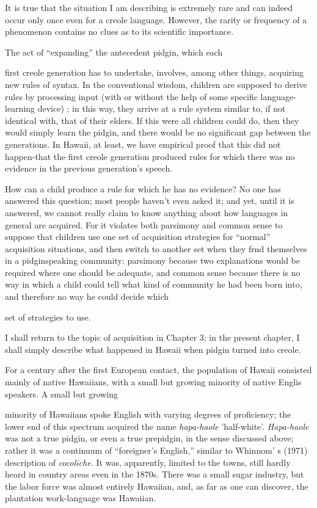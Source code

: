 It is true that the situation I am describing is extremely rare and can indeed occur only once even for a creole language. However, the rarity or frequency of a phenomenon contains no clues as to its scientific importance.

The act of ``expanding'' the antecedent pidgin, which each

first creole generation has to undertake, involves, among other things, acquiring new rules of syntax. In the conventional wisdom, children are supposed to derive rules by processing input (with or without the help of some specific language-learning device) ; in this way, they arrive at a rule system similar to, if not identical with, that of their elders. If this were all children could do, then they would simply learn the pidgin, and there would be no significant gap between the generations. In Hawaii, at least, we have empirical proof that this did not happen-that the first creole generation produced rules for which there was no evidence in the previous generation's speech.

How can a child produce a rule for which he has no evidence? No one has answered this question; most people haven't even asked it; and yet, until it is answered, we cannot really claim to know any\-thing about how languages in general are acquired. For it violates both parsimony and common sense to suppose that children use one set of acquisition strategies for ``normal'' acquisition situations, and then switch to another set when they frnd themselves in a pidgin\-speaking community: parsimony because two explanations would be required where one should be adequate, and common sense because there is no way in which a child could tell what kind of community he had been born into, and therefore no way he could decide which

set of strategies to use.

I shall return to the topic of acquisition in Chapter 3; in the present chapter, I shall simply describe what happened in Hawaii when pidgin turned into creole.

For a century after the first European contact, the population of Hawaii consisted mainly of native Hawaiians, with a small but growing minority of native Englis speakers. A small but growing

minority of Hawaiians spoke English with varying degrees of profi\-ciency; the lower end of this spectrum acquired the name \textit{hapa-haole} 'half-white'. \textit{Hapa-haole} was not a true pidgin, or even a true pre\-pidgin, in the sense discussed above; rather it was a continuum of ``foreigner's English,'' similar to Whinnom' s (1971) description of \textit{cocoliche.} It was, apparently, limited to the towns, still hardly heard in country areas even in the 1870s. There was a small sugar industry, but the labor force was almost entirely Hawaiian, and, as far as one can discover, the plantation work-language was Hawaiian.

